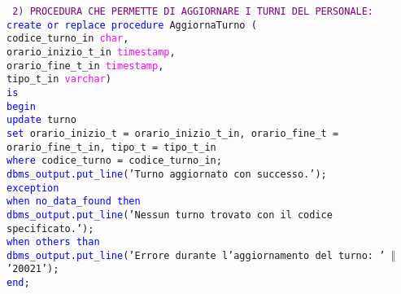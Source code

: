 \documentclass{article}
\begin{document}
    \begin{flushleft}
        \texttt{
        \textcolor{purple}{2) PROCEDURA CHE PERMETTE DI AGGIORNARE I TURNI DEL PERSONALE:} \\
        \hspace*{2em}\textcolor{blue}{create or replace procedure} AggiornaTurno ( \\
        \hspace*{4em}codice\_turno\_in \textcolor{magenta}{char}, \\
        \hspace*{4em}orario\_inizio\_t\_in \textcolor{magenta}{timestamp}, \\
        \hspace*{4em}orario\_fine\_t\_in \textcolor{magenta}{timestamp}, \\
        \hspace*{4em}tipo\_t\_in \textcolor{magenta}{varchar}) \\
        \hspace*{2em}\textcolor{blue}{is} \\
        \hspace*{2em}\textcolor{blue}{begin} \\
        \hspace*{4em}\textcolor{blue}{update} turno \\
        \hspace*{4em}\textcolor{blue}{set} orario\_inizio\_t = orario\_inizio\_t\_in, orario\_fine\_t = orario\_fine\_t\_in, \hspace*{4em}tipo\_t = tipo\_t\_in \\
        \hspace*{4em}\textcolor{blue}{where} codice\_turno = codice\_turno\_in; \\
        \hspace*{4em}\textcolor{blue}{dbms\_output.put\_line}('Turno aggiornato con successo.'); \\
        \hspace*{2em}\textcolor{blue}{exception} \\
        \hspace*{4em}\textcolor{blue}{when no\_data\_found then} \\
        \hspace*{6em}\textcolor{blue}{dbms\_output.put\_line}('Nessun turno trovato con il codice \hspace*{6em}specificato.'); \\
        \hspace*{4em}\textcolor{blue}{when others than} \\
            \hspace*{6em}\textcolor{blue}{dbms\_output.put\_line}('Errore durante l'aggiornamento del turno: ' $\Vert$ \hspace*{6em}'20021'); \\
        \hspace*{2em}\textcolor{blue}{end};}
    \end{flushleft}
\end{document}
